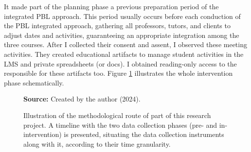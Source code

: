 
It made part of the planning phase a previous preparation period of the integrated \gls{PBL} approach. This period usually occurs before each conduction of the PBL integrated approach, gathering all professors, tutors, and clients to adjust dates and activities, guaranteeing an appropriate integration among the three courses. After I collected their consent and assent, I observed these meeting activities. They created educational artifacts to manage student activities in the \gls{LMS} and private spreadsheets (or docs). I obtained reading-only access to the responsible for these artifacts too. Figure \ref{fig:methodological-route} illustrates the whole intervention phase schematically. 

\begin{figure}[ht!]
\centering

\caption{\textmd{Illustration of the methodological route of part of this research project. A timeline with the two data collection phases (pre- and in-intervention) is presented, situating the data collection instruments along with it, according to their time granularity.}}
\label{fig:methodological-route}

\par\medskip\ABNTEXfontereduzida\selectfont\textbf{Source:} Created by the author (2024).
\end{figure}

